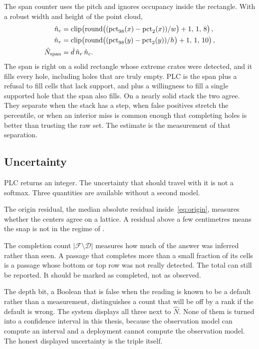The span counter uses the pitch and ignores occupancy inside the rectangle. With a robust width and height of the point cloud,
\begin{equation}
\begin{aligned}
\hat{n}_c &= \operatorname{clip}\!\left(
\operatorname{round}\!\big((\operatorname{pct}_{98}(x)-\operatorname{pct}_{2}(x))/w\big)+1,\,1,\,8\right),\\
\hat{n}_r &= \operatorname{clip}\!\left(
\operatorname{round}\!\big((\operatorname{pct}_{98}(y)-\operatorname{pct}_{2}(y))/h\big)+1,\,1,\,10\right),\\
\hat{N}_{\text{span}} &= \hat{d}\,\hat{n}_r\,\hat{n}_c.
\end{aligned}
\label{eq:span}
\end{equation}
The span is right on a solid rectangle whose extreme crates were detected, and it fills every hole, including holes that are truly empty. PLC is the span plus a refusal to fill cells that lack support, and plus a willingness to fill a single supported hole that the span also fills. On a nearly solid stack the two agree. They separate when the stack has a step, when false positives stretch the percentile, or when an interior miss is common enough that completing holes is better than trusting the raw set. The estimate is the measurement of that separation.

\subsection{Uncertainty}
\label{sec:plc-uncertainty}

PLC returns an integer. The uncertainty that should travel with it is not a softmax. Three quantities are available without a second model.

The origin residual, the median absolute residual inside~\eqref{eq:origin}, measures whether the centers agree on a lattice. A residual above a few centimetres means the snap is not in the regime of .

The completion count $\lvert\mathcal{F}\setminus\mathcal{D}\rvert$ measures how much of the answer was inferred rather than seen. A passage that completes more than a small fraction of its cells is a passage whose bottom or top row was not really detected. The total can still be reported. It should be marked as completed, not as observed.

The depth bit, a Boolean that is false when the reading is known to be a default rather than a measurement, distinguishes a count that will be off by a rank if the default is wrong. The system displays all three next to $\hat{N}$. None of them is turned into a confidence interval in this thesis, because the observation model can compute an interval and a deployment cannot compute the observation model. The honest displayed uncertainty is the triple itself.

